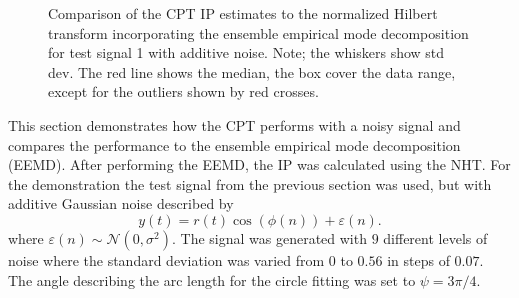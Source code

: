 \documentclass[a4paper]{IEEEtran}
\begin{document}
\begin{figure}[ht]
		\caption{Comparison of the CPT IP estimates to the normalized Hilbert transform incorporating the ensemble empirical mode decomposition for test signal 1 with additive noise. Note; the whiskers show std dev. The red line shows the median, the box cover the data range, except for the outliers shown by red crosses.}
		\label{fig:RMSEComparison}
\end{figure}

This section demonstrates how the CPT performs with a noisy signal and compares the performance to the ensemble empirical mode decomposition (EEMD). After performing the EEMD, the IP was calculated using the NHT. For the demonstration the test signal from the previous section was used, but with additive Gaussian noise described by
\begin{equation}
    y(t)=r\left(t\right)\cos\left(\phi\left(n\right)\right) + \varepsilon \left( n \right).
\end{equation}
where $\varepsilon(n) \sim \mathcal{N}(0,\sigma^2)$. The signal was generated with $9$ different levels of noise where the standard deviation was varied from $0$ to $0.56$ in steps of $0.07$. The angle describing the arc length for the circle fitting was set to $\psi=3\pi/4$. 
\end{document}
